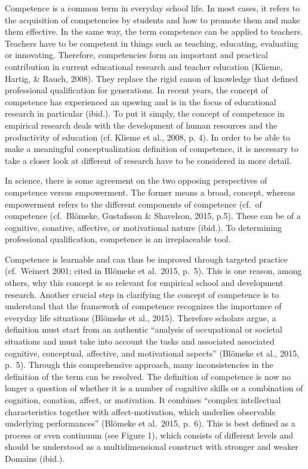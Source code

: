\documentclass[
  man]{apa6}
\begin{document}
Competence is a common term in everyday school life. In most cases, it refers to the acquisition of competencies by students and how to promote them and make them effective. In the same way, the term competence can be applied to teachers. Teachers have to be competent in things such as teaching, educating, evaluating or innovating. Therefore, competencies form an important and practical contribution in current educational research and teacher education (Klieme, Hartig, \& Rauch, 2008). They replace the rigid canon of knowledge that defined professional qualification for generations. In recent years, the concept of competence has experienced an upswing and is in the focus of educational research in particular (ibid.). To put it simply, the concept of competence in empirical research deals with the development of human resources and the productivity of education (cf. Klieme et al., 2008, p. 4). In order to be able to make a meaningful conceptualization definition of competence, it is necessary to take a closer look at different of research have to be considered in more detail.

In science, there is some agreement on the two opposing perspectives of competence versus empowerment. The former means a broad, concept, whereas empowerment refers to the different components of competence (cf.~of competence (cf.~Blömeke, Gustafsson \& Shavelson, 2015, p.5). These can be of a cognitive, conative, affective, or motivational nature (ibid.). To determining professional qualification, competence is an irreplaceable tool.

Competence is learnable and can thus be improved through targeted practice (cf.~Weinert 2001; cited in Blömeke et al.~2015, p.~5). This is one reason, among others, why this concept is so relevant for empirical school and development research. Another crucial step in clarifying the concept of competence is to understand that the framework of competence recognizes the importance of everyday life situations (Blömeke et al., 2015). Therefore scholars argue, a definition must start from an authentic ``analysis of occupational or societal situations and must take into account the tasks and associated associated cognitive, conceptual, affective, and motivational aspects'' (Blömeke et al., 2015, p.~5). Through this comprehensive approach, many inconsistencies in the definition of the term can be resolved. The definition of competence is now no longer a question of whether it is a number of cognitive skills or a combination of cognition, conation, affect, or motivation. It combines ``complex intellectual characteristics together with affect-motivation, which underlies observable underlying performances'' (Blömeke et al.~2015, p.~6). This is best defined as a process or even continuum (see Figure 1), which consists of different levels and should be understood as a multidimensional construct with stronger and weaker Domains (ibid.).
\end{document}

